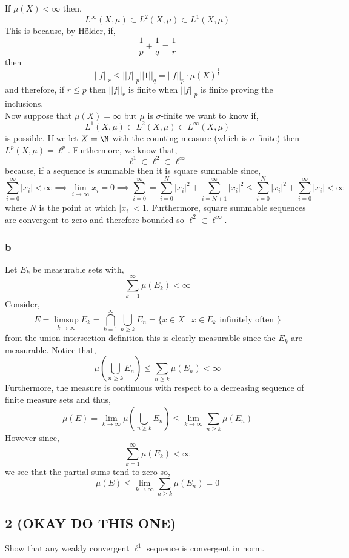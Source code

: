 \documentclass[12pt]{article}
\begin{document}
If $\mu(X) < \infty$ then,
\[ L^\infty(X, \mu) \subset L^2(X, \mu) \subset L^1(X, \mu) \]
This is because, by H\"{o}lder, if,
\[ \frac{1}{p} + \frac{1}{q} = \frac{1}{r} \]
then
\[ || f ||_r \le || f ||_p || 1 ||_q = || f ||_p \cdot \mu(X)^{\frac{1}{r}} \]
and therefore, if $r \le p$ then $|| f ||_r$ is finite when $|| f ||_p$ is finite proving the inclusions.
\bigskip\\
Now suppose that $\mu(X) = \infty$ but $\mu$ is $\sigma$-finite we want to know if,
\[ L^1(X, \mu) \subset L^2(X, \mu) \subset L^\infty(X, \mu) \]
is possible.
If we let $X = \N$ with the counting measure (which is $\sigma$-finite) then $L^p(X, \mu) = \ell^p$. Furthermore, we know that,
\[ \ell^1 \subset \ell^2 \subset \ell^\infty \]
because, if a sequence is summable then it is square summable since,
\[ \sum_{i = 0}^\infty | x_i | < \infty \implies \lim_{i \to \infty} x_i = 0 \implies \sum_{i = 0}^\infty = \sum_{i = 0}^N |x_i|^2 + \sum_{i = N+1}^\infty | x_i |^2 \le \sum_{i = 0}^N |x_i|^2 +  \sum_{i = 0}^\infty | x_i | < \infty \]
where $N$ is the point at which $| x_i | < 1$. Furthermore, square summable sequences are convergent to zero and therefore bounded so $\ell^2 \subset \ell^\infty$.

\subsubsection{b}

Let $E_k$ be measurable sets with,
\[ \sum_{k = 1}^\infty \mu(E_k) < \infty \]
Consider, 
\[ E = \limsup_{k \to \infty} E_k = \bigcap_{k = 1}^\infty \bigcup_{n \ge k} E_n = \{ x \in X \mid x \in E_k \text{ infinitely often } \} \]
from the union intersection definition this is clearly measurable since the $E_k$ are measurable. Notice that,
\[ \mu \left( \bigcup_{n \ge k} E_n \right) \le \sum_{n \ge k} \mu(E_n) < \infty \]
Furthermore, the measure is continuous with respect to a decreasing sequence of finite measure sets and thus,
\[ \mu(E) = \lim_{k \to \infty} \mu\left( \bigcup_{n \ge k} E_n \right) \le  \lim_{k \to \infty} \sum_{n \ge k} \mu(E_n) \]
However since,
\[ \sum_{k = 1}^\infty \mu(E_k) < \infty \]
we see that the partial sums tend to zero so,
\[ \mu(E) \le \lim_{k \to \infty} \sum_{n \ge k} \mu(E_n) = 0 \]

\subsection{2 (OKAY DO THIS ONE)}

\begin{exercise}
Show that any weakly convergent $\ell^1$ sequence is convergent in norm.
\end{exercise}
\end{document}
